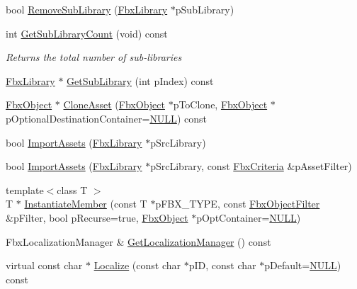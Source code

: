 \begin{DoxyCompactItemize}
bool \hyperlink{class_fbx_library_af49b9811d383dbdc86bc805b72970ad9}{Remove\+Sub\+Library} (\hyperlink{class_fbx_library}{Fbx\+Library} $\ast$p\+Sub\+Library)
\item 
int \hyperlink{class_fbx_library_aa5c3590309cfdf028cf367f6d9431ce2}{Get\+Sub\+Library\+Count} (void) const
\begin{DoxyCompactList}\small\item\em Returns the total number of sub-\/libraries \end{DoxyCompactList}\item 
\hyperlink{class_fbx_library}{Fbx\+Library} $\ast$ \hyperlink{class_fbx_library_a3a6f41a432b2f0db2966f51d8ccc511e}{Get\+Sub\+Library} (int p\+Index) const
\item 
\hyperlink{class_fbx_object}{Fbx\+Object} $\ast$ \hyperlink{class_fbx_library_ad1c56ae40f4e371c7e0395ce3362dbcc}{Clone\+Asset} (\hyperlink{class_fbx_object}{Fbx\+Object} $\ast$p\+To\+Clone, \hyperlink{class_fbx_object}{Fbx\+Object} $\ast$p\+Optional\+Destination\+Container=\hyperlink{fbxarch_8h_a070d2ce7b6bb7e5c05602aa8c308d0c4}{N\+U\+LL}) const
\item 
bool \hyperlink{class_fbx_library_a1b1dd291ec8d1858225190ae40600581}{Import\+Assets} (\hyperlink{class_fbx_library}{Fbx\+Library} $\ast$p\+Src\+Library)
\item 
bool \hyperlink{class_fbx_library_a2970dc9bde3b76130571ad959cd58389}{Import\+Assets} (\hyperlink{class_fbx_library}{Fbx\+Library} $\ast$p\+Src\+Library, const \hyperlink{class_fbx_criteria}{Fbx\+Criteria} \&p\+Asset\+Filter)
\item 
{\footnotesize template$<$class T $>$ }\\T $\ast$ \hyperlink{class_fbx_library_a9b4d4a5327f1ef11bd0251a968ce9452}{Instantiate\+Member} (const T $\ast$p\+F\+B\+X\+\_\+\+T\+Y\+PE, const \hyperlink{class_fbx_object_filter}{Fbx\+Object\+Filter} \&p\+Filter, bool p\+Recurse=true, \hyperlink{class_fbx_object}{Fbx\+Object} $\ast$p\+Opt\+Container=\hyperlink{fbxarch_8h_a070d2ce7b6bb7e5c05602aa8c308d0c4}{N\+U\+LL})
\item 
Fbx\+Localization\+Manager \& \hyperlink{class_fbx_library_a4fefd2b63aa4db5519af446945c0adef}{Get\+Localization\+Manager} () const
\item 
virtual const char $\ast$ \hyperlink{class_fbx_library_a6f71bf208f95cc8033123e173e64b298}{Localize} (const char $\ast$p\+ID, const char $\ast$p\+Default=\hyperlink{fbxarch_8h_a070d2ce7b6bb7e5c05602aa8c308d0c4}{N\+U\+LL}) const
\item 

\end{DoxyCompactItemize}

